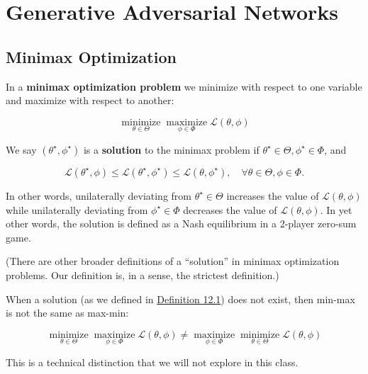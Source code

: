\documentclass{report}
\begin{document}
\chapter{Generative Adversarial Networks}

\section{Minimax Optimization}

\begin{definition}
    In a \textbf{minimax optimization problem} we minimize with respect to one variable and maximize with respect to another:

    $$
    \underset{\theta \in \Theta}{\operatorname{minimize}} \underset{\phi \in \Phi}{\operatorname{maximize}} \mathcal{L}(\theta, \phi)
    $$

    We say $\left(\theta^{\star}, \phi^{\star}\right)$ is a \textbf{solution} to the minimax problem if $\theta^{\star} \in \Theta, \phi^{\star} \in \Phi$, and

    $$
    \mathcal{L}\left(\theta^{\star}, \phi\right) \leq \mathcal{L}\left(\theta^{\star}, \phi^{\star}\right) \leq \mathcal{L}\left(\theta, \phi^{\star}\right), \quad \forall \theta \in \Theta, \phi \in \Phi .
    $$

    In other words, unilaterally deviating from $\theta^{\star} \in \Theta$ increases the value of $\mathcal{L}(\theta, \phi)$ while unilaterally deviating from $\phi^{\star} \in \Phi$ decreases the value of $\mathcal{L}(\theta, \phi)$. In yet other words, the solution is defined as a Nash equilibrium in a 2-player zero-sum game.

    (There are other broader definitions of a “solution” in minimax optimization problems. Our definition is, in a sense, the strictest definition.)
\end{definition}

\begin{concept}
    When a solution (as we defined in \hyperref[definition:12.1]{Definition 12.1}) does not exist, then min-max is not the same as max-min:

    $$
    \underset{\theta \in \Theta}{\operatorname{minimize}} \underset{\phi \in \Phi}{\operatorname{maximize}} \mathcal{L}(\theta, \phi) \neq \underset{\phi \in \Phi}{\operatorname{maximize}} \underset{\theta \in \Theta}{\operatorname{minimize}} \mathcal{L}(\theta, \phi)
    $$

    This is a technical distinction that we will not explore in this class.
\end{concept}
\end{document}
